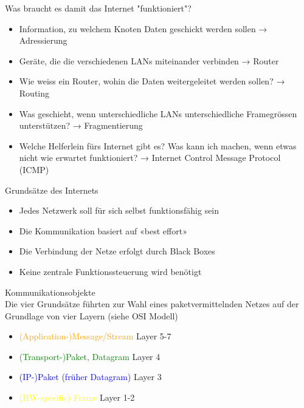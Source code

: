 \begin{concept}{Was braucht es damit das Internet "funktioniert"?}
    \begin{itemize}
        \item Information, zu welchem Knoten Daten geschickt werden sollen → Adressierung
        \item Geräte, die die verschiedenen LANs miteinander verbinden → Router
        \item Wie weiss ein Router, wohin die Daten weitergeleitet werden sollen? → Routing
        \item Was geschieht, wenn unterschiedliche LANs unterschiedliche Framegrössen unterstützen? → Fragmentierung
        \item Welche Helferlein fürs Internet gibt es? Was kann ich machen, wenn etwas nicht wie erwartet funktioniert? → Internet Control Message Protocol (ICMP)
    \end{itemize}
\end{concept}

\begin{lemma}{Grundsätze des Internets}
    \begin{itemize}
        \item Jedes Netzwerk soll für sich selbst funktionsfähig sein
        \item Die Kommunikation basiert auf «best effort»
        \item Die Verbindung der Netze erfolgt durch Black Boxes
        \item Keine zentrale Funktionssteuerung wird benötigt
    \end{itemize}
\end{lemma}

\begin{definition}{Kommunikationsobjekte}\\
    Die vier Grundsätze führten zur Wahl eines paketvermittelnden Netzes auf der Grundlage von vier Layern (siehe OSI Modell)

    \begin{itemize}
        \item \textcolor{orange}{(Application-)Message/Stream} Layer 5-7
        \item \textcolor{green}{(Transport-)Paket, Datagram} Layer 4
        \item \textcolor{blue}{(IP-)Paket (früher Datagram)} Layer 3
        \item \textcolor{yellow}{(HW-specific) Frame} Layer 1-2
    \end{itemize}
\end{definition}

